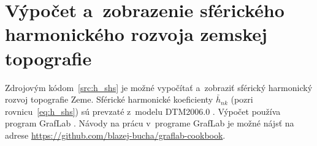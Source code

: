 \documentclass[a4paper,12pt]{book}
\begin{document}
\chapter{Výpočet a~zobrazenie sférického harmonického rozvoja zemskej
topografie}
\label{app:shs_topography}

Zdrojovým kódom~\ref{src:h_shs} je možné vypočítať a~zobraziť sférický 
harmonický rozvoj topografie Zeme.  Sférické harmonické koeficienty 
$\bar{h}_{nk}$ (pozri rovnicu~\ref{eq:h_shs}) sú prevzaté z~modelu DTM2006.0 
\parencite{DTM2006}.  Výpočet používa program GrafLab \parencite{GrafLab}.  
Návody na prácu v~programe GrafLab je možné nájsť na adrese 
\url{https://github.com/blazej-bucha/graflab-cookbook}.








\printbibliography[title=Literat\'{u}ra]

\end{document}
